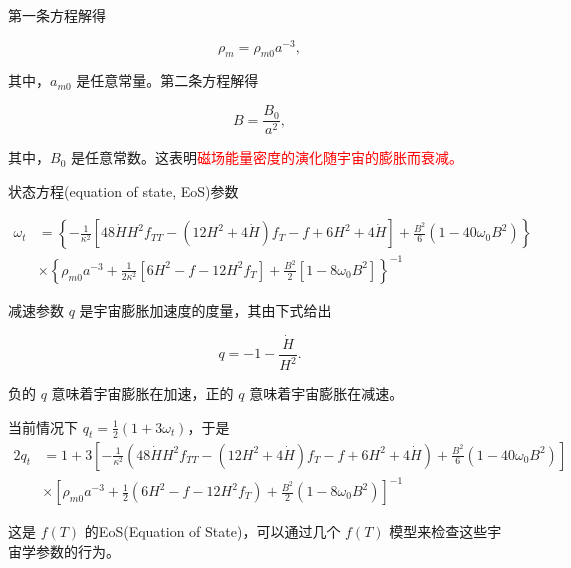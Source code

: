 \documentclass[9pt, dvipsnames]{beamer} %
\begin{document}
\begin{frame}
    第一条方程解得

    $$
    \rho_m = \rho_{m0} a^{-3},
    $$

    其中，$a_{m0}$ 是任意常量。第二条方程解得

    $$
    B=\frac{B_0}{a^2},
    $$

    其中，$B_0$ 是任意常数。这表明\textcolor{red}{磁场能量密度的演化随宇宙的膨胀而衰减。}

    状态方程(equation of state, EoS)参数

    $$
    \begin{aligned}
        \omega_t
        &=\left\{-\frac{1 }{\kappa^2 } \left[48\dot{H}H^2 f_{TT} - \left(12 H^2 + 4\dot{H} \right) f_T - f + 6 H^2 + 4\dot{H} \right] + \frac{B^2 }{6 } \left(1-40\omega_0 B^2 \right) \right\} \\
        &\times \left\{\rho_{m0} a^{-3} + \frac{1 }{2\kappa^2 } \left[6 H^2 - f-12 H^2 f_T \right] + \frac{B^2 }{2 } \left[1-8\omega_0 B^2 \right] \right\}^{-1}
        \end{aligned}
    $$

    减速参数 $q$ 是宇宙膨胀加速度的度量，其由下式给出

    $$
    q = -1 - \frac{\dot{H} }{H^2 } .
    $$

    负的 $q$ 意味着宇宙膨胀在加速，正的 $q$ 意味着宇宙膨胀在减速。

\end{frame}

\begin{frame}
    当前情况下 $q_t=\frac{1}{2}(1+3\omega_t)$，于是
    $$
    \begin{aligned}
        2q_t
        &=1 + 3\left[-\frac{1 }{\kappa^2 } \left(48\dot{H} H^2 f_{TT} - \left(12 H^2 + 4\dot{H} \right) f_T - f + 6H^2 + 4\dot{H} \right) + \frac{B^2 }{6 } \left(1-40\omega_0 B^2 \right) \right] \\
        &\times \left[\rho_{m0}a^{-3} + \frac{1 }{2 } \left(6H^2-f-12H^2 f_T \right) + \frac{B^2 }{2 } \left(1-8\omega_0 B^2 \right) \right]^{-1}
    \end{aligned}
    $$

    这是 $f(T)$ 的EoS(Equation of State)，可以通过几个 $f(T)$ 模型来检查这些宇宙学参数的行为。
\end{frame}
\end{document}
